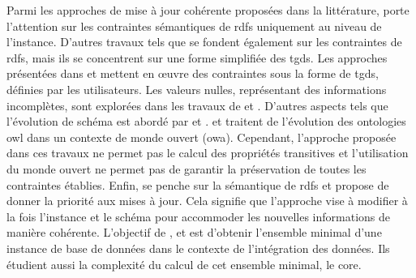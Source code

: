 Parmi les approches de mise à jour cohérente proposées dans la littérature, \cite{goasdoueEfficientQueryAnswering2013} porte l'attention sur les contraintes sémantiques de \gls{rdfs} uniquement au niveau de l'instance.
D'autres travaux tels que \cite{halfedferrariRDFUpdatesConstraints2017} se fondent également sur les contraintes de \gls{rdfs}, mais ils se concentrent sur une forme simplifiée des \glspl{tgd}.
Les approches présentées dans \cite{flourisFormalFoundationsRDF2013} et \cite{chabinUsingGraphGrammar2019} mettent en œuvre des contraintes sous la forme de \glspl{tgd}, définies par les utilisateurs.
Les valeurs nulles, représentant des informations incomplètes, sont explorées dans les travaux de \cite{halfedferrariRDFUpdatesConstraints2017} et \cite{chabinUsingGraphGrammar2019}.
D'autres aspects tels que l'évolution de schéma est abordé par \cite{flourisFormalFoundationsRDF2013} et \cite{goasdoueEfficientQueryAnswering2013}.
\cite{mahfoudhAdaptationOntologiesAvec2015} et \cite{mahfoudhAlgebraicGraphTransformations2015} traitent de l'évolution des ontologies \gls{owl} dans un contexte de monde ouvert (\acs{owa}).
Cependant, l'approche proposée dans ces travaux ne permet pas le calcul des propriétés transitives et l'utilisation du monde ouvert ne permet pas de garantir la préservation de toutes les contraintes établies.
Enfin, \cite{chabinUsingGraphGrammar2019} se penche sur la sémantique de \gls{rdfs} et propose de donner la priorité aux mises à jour.
Cela signifie que l'approche vise à modifier à la fois l'instance et le schéma pour accommoder les nouvelles informations de manière cohérente.
L'objectif de \cite{faginDataExchangeGetting2005}, \cite{gottlobComputingCoresData2005} et \cite{pichlerComplexityEvaluatingTuple2011} est d'obtenir l'ensemble minimal d'une instance de base de données dans le contexte de l'intégration des données.
Ils étudient aussi la complexité du calcul de cet ensemble minimal, le \gls{core}.

